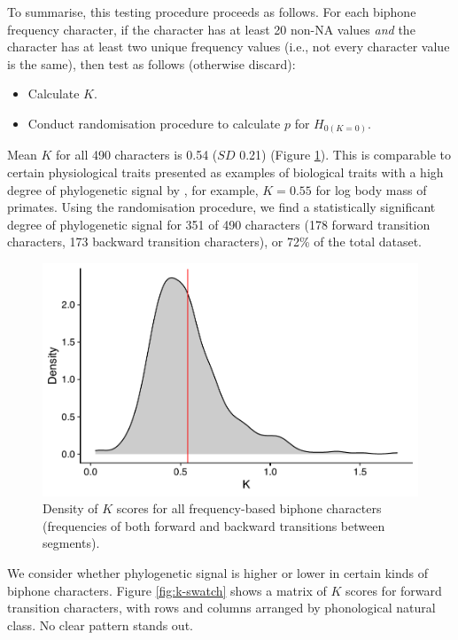 To summarise, this testing procedure proceeds as follows. For each biphone frequency character, if the character has at least 20 non-NA values \emph{and} the character has at least two unique frequency values (i.e., not every character value is the same), then test as follows (otherwise discard):

\begin{itemize}
\tightlist
\item
  Calculate \(K\).
\item
  Conduct randomisation procedure to calculate \(p\) for \(H_{0(K = 0)}\).
\end{itemize}

Mean \(K\) for all 490 characters is 0.54 (\(SD\) 0.21) (Figure \ref{fig:k-density}). This is comparable to certain physiological traits presented as examples of biological traits with a high degree of phylogenetic signal by \textcite{blomberg_testing_2003}, for example, \(K=0.55\) for log body mass of primates. Using the \textcite{blomberg_testing_2003} randomisation procedure, we find a statistically significant degree of phylogenetic signal for 351 of 490 characters (178 forward transition characters, 173 backward transition characters), or 72\% of the total dataset.

\begin{figure}[tbp]

{\centering \includegraphics[width=0.66\linewidth]{05-phylo-signal/fig/k-density} 

}

\caption[Density of $K$ scores for all frequency-based biphone characters]{Density of $K$ scores for all frequency-based biphone characters (frequencies of both forward and backward transitions between segments).}\label{fig:k-density}
\end{figure}

We consider whether phylogenetic signal is higher or lower in certain kinds of biphone characters. Figure \ref{fig:k-swatch} shows a matrix of \(K\) scores for forward transition characters, with rows and columns arranged by phonological natural class. No clear pattern stands out.

